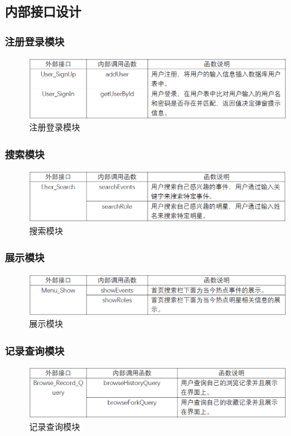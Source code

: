 \subsection{内部接口设计}
\subsubsection{注册登录模块}
\begin{figure}[!htbp]
	\centering
	\includegraphics[scale=0.7]{image/m2.png}
	\caption{注册登录模块}
\end{figure}
\subsubsection{搜索模块}
\begin{figure}[!htbp]
	\centering
	\includegraphics[scale=0.7]{image/m3.png}
	\caption{搜索模块}
\end{figure}
\subsubsection{展示模块}
\begin{figure}[!htbp]
	\centering
	\includegraphics[scale=0.7]{image/m4.png}
	\caption{展示模块}
\end{figure}
\subsubsection{记录查询模块}
\begin{figure}[!htbp]
	\centering
	\includegraphics[scale=0.7]{image/m5.png}
	\caption{记录查询模块}
\end{figure}
